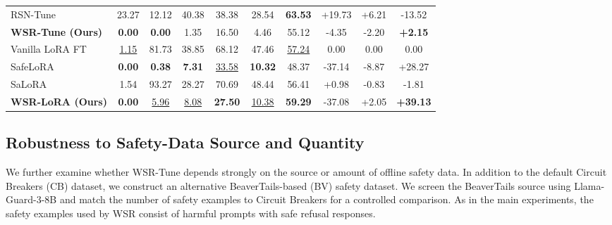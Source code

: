 \documentclass{article}
\begin{document}
\begin{table}[t]
{\begin{tabular}{lccccccccc}
RSN-Tune
& 23.27 & 12.12 & 40.38 & 38.38 & 28.54 & \textbf{63.53}
& +19.73 & +6.21 & -13.52 \\

\textbf{WSR-Tune (Ours)}
& \textbf{0.00} & \textbf{0.00} & 1.35 & 16.50 & 4.46 & 55.12
& -4.35 & -2.20 & \cellcolor{green!20}\textbf{+2.15} \\

\midrule

Vanilla LoRA FT
& \uline{1.15} & 81.73 & 38.85 & 68.12 & 47.46 & \uline{57.24}
& 0.00 & 0.00 & 0.00 \\

SafeLoRA
& \textbf{0.00} & \textbf{0.38} & \textbf{7.31} & \uline{33.58} & \textbf{10.32} & 48.37
& -37.14 & -8.87 & +28.27 \\

SaLoRA
& 1.54 & 93.27 & 28.27 & 70.69 & 48.44 & 56.41
& +0.98 & -0.83 & -1.81 \\

\textbf{WSR-LoRA (Ours)}
& \textbf{0.00} & \uline{5.96} & \uline{8.08} & \textbf{27.50} & \uline{10.38} & \textbf{59.29}
& -37.08 & +2.05 & \cellcolor{green!20}\textbf{+39.13} \\

\bottomrule
\end{tabular}
}
\vspace{-4mm}
\end{table}


















\subsection{Robustness to Safety-Data Source and Quantity}
\label{app:safety_data}

We further examine whether WSR-Tune depends strongly on the source or amount of offline safety data. In addition to the default Circuit Breakers (CB) dataset, we construct an alternative BeaverTails-based (BV) safety dataset. We screen the BeaverTails source using Llama-Guard-3-8B and match the number of safety examples to Circuit Breakers for a controlled comparison. As in the main experiments, the safety examples used by WSR consist of harmful prompts with safe refusal responses.
\end{document}
